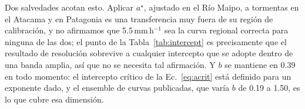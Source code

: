 \documentclass[authoryear,preprint,review,12pt]{elsarticle}
\begin{document}
Dos salvedades acotan esto. Aplicar $a^\star$, ajustado en el Río Maipo, a
tormentas en el Atacama y en Patagonia es una transferencia muy fuera de su región
de calibración, y no afirmamos que 5.5\,mm\,h$^{-1}$ sea la curva regional correcta
para ninguna de las dos; el punto de la Tabla~\ref{tab:intercept} es precisamente
que el resultado de resolución sobrevive a cualquier intercepto que se adopte
dentro de una banda amplia, así que no se necesita tal afirmación. Y $b$ se
mantiene en 0.39 en todo momento: el intercepto crítico de la Ec.~\ref{eq:acrit}
está definido para un exponente dado, y el ensemble de curvas publicadas, que varía
$b$ de 0.19 a 1.50, es lo que cubre esa dimensión.

\begin{table}[ht]
\centering
\caption{Intercepto I--D crítico $a_\mathrm{crit}$ (Ec.~\ref{eq:acrit}, $b=0.39$)
por evento y resolución de la forzante, y la banda de interceptos en la que la
resolución por sí sola decide la detección.}
\label{tab:intercept}

\end{table}
\end{document}
